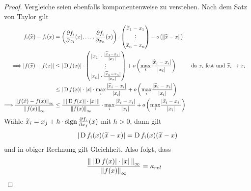 \begin{proof}
  Vergleiche seien ebenfalls komponentenweise zu verstehen.
  Nach dem Satz von Taylor gilt
 \begin{align*}
    f_i(\widetilde{x})-f_i(x) 
     &= \left( 
       \frac{\partial f_i}{\partial x_i}(x),
       \dotsc ,\frac{\partial f_i}{\partial x_n}(x) 
       \right)
       \cdot \begin{pmatrix}
         \widetilde{x}_1-x_1 \\
         \vdots \\
         \widetilde{x}_n-x_n
       \end{pmatrix}
     + o\left(\nn[\widetilde{x}-x]\right) \\
   \Longrightarrow 
   |f(\widetilde{x})-f(x)|
     &\leq |\D f(x)|
       \cdot \begin{pmatrix}
       |x_1|\cdot \frac{|\widetilde{x}_1-x_1|}{|x_1|}\\
       \vdots \\
       |x_n|\cdot \frac{|\widetilde{x}_n-x_n|}{|x_n|}
       \end{pmatrix}
   + o\left(
   \underset{i}{\max} \frac{|\widetilde{x}_i-x_i|}{|x_i|}
   \right)
     && \text{da $x_i$ fest und $\widetilde{x}_i\to x_i$} \\
     &\leq |\D f(x)| \cdot |x| 
       \cdot \underset{i}{\max} \frac{|\widetilde{x}_i-x_i|}{|x_i|}
       + o\left(
       \underset{i}{\max} \frac{|\widetilde{x}_i-x_i|}{|x_i|}
       \right) \\
   \Longrightarrow \frac{\nn[f(\widetilde{x})-f(x)]_\infty}{\nn[f(x)]_\infty}
     &\leq  \frac{\nn[\,|\D f(x)|\cdot |x| \,]}{\nn[f(x)]_\infty}
       \cdot \underset{i}{\max}\frac{|\widetilde{x}_i-x_i|}{|x_i|}
       + o\left( 
       \underset{i}{\max} \frac{|\widetilde{x}_i-x_i|}{|x_i|} 
       \right)
 \end{align*}
  Wähle $\widetilde{x}_i = x_j+h\cdot \Sign \frac{\partial f_i}{\partial x_j}(x)$ mit $h>0$,
  dann gilt
  \begin{gather*}
    |\D f_i(x)(\widetilde{x}-x)| = \D f_i(x)(\widetilde{x}-x)
  \end{gather*}
  und in obiger Rechnung gilt Gleichheit.
  Also folgt, dass
  \begin{align*}
    \frac{\nn[\,|\D f(x)|\cdot |x| \, ]_\infty}{\nn[f(x)]_\infty} &= \kappa_{rel} 
  \end{align*}
\end{proof}

